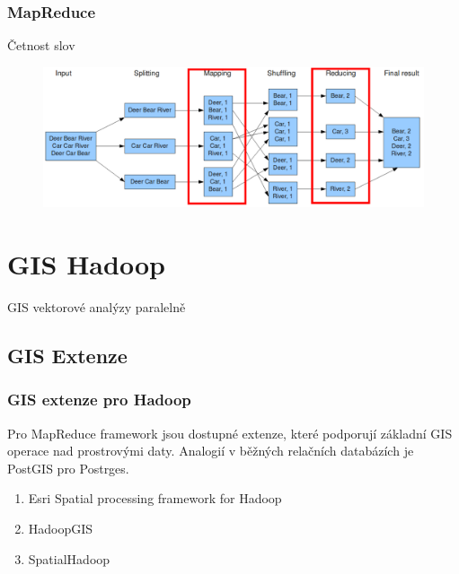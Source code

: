 \documentclass[unicode,bookmarksnumbered]{beamer}
\begin{document}
	\begin{frame}
		\frametitle{MapReduce}
		Četnost slov
		\begin{figure}
			\centering
			\includegraphics[width=1\textwidth]{./img/hadoop/maprede.png}
			\label{fig:eu_all}
		\end{figure}
	\end{frame}
%



	\section{GIS Hadoop}
	\begin{frame}[c]
		\begin{center}	
		\Huge GIS vektorové analýzy paralelně
		\end{center}
	\end{frame}
	
	
		\subsection{GIS Extenze}
		\begin{frame}
			\frametitle{GIS extenze pro Hadoop}
		Pro MapReduce framework jsou dostupné extenze, které podporují základní GIS
operace nad prostrovými daty. Analogií v běžných relačních databázích je PostGIS
pro Postrges.
			\begin{enumerate}
				\item Esri Spatial processing framework for Hadoop
				\item HadoopGIS
				\item SpatialHadoop
			\end{enumerate}
		\end{frame}
%
\end{document}
